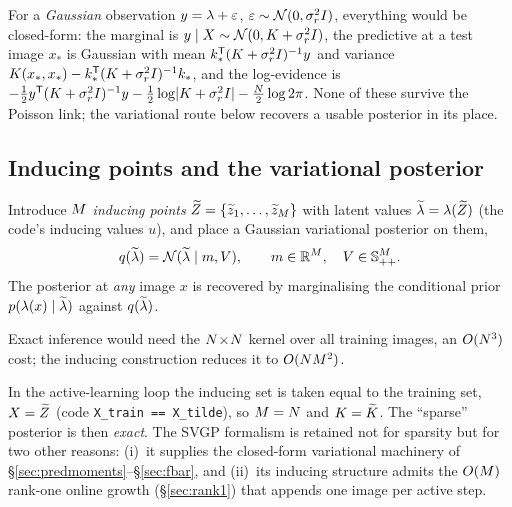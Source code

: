 \begin{remark}
For a \emph{Gaussian} observation $y=\lambda+\varepsilon$,
$\varepsilon\sim\mathcal{N}(0,\sigma^{2}_r I)$, everything would be closed-form: the
marginal is $y\mid X\sim\mathcal{N}(0,K+\sigma^{2}_r I)$, the predictive at a test
image $x_\ast$ is Gaussian with mean $k_\ast^{\mathsf{T}}(K+\sigma^{2}_r I)^{-1}y$
and variance $K(x_\ast,x_\ast)-k_\ast^{\mathsf{T}}(K+\sigma^{2}_r I)^{-1}k_\ast$,
and the log-evidence is
$-\tfrac12y^{\mathsf{T}}(K+\sigma^{2}_r I)^{-1}y-\tfrac12\log\lvert K+\sigma^{2}_r I\rvert-\tfrac{N}{2}\log 2\pi$.
None of these survive the Poisson link; the variational route below recovers a
usable posterior in its place.
\end{remark}

\subsection{Inducing points and the variational posterior}\label{sec:inducing}

\begin{definition}
Introduce $M$ \emph{inducing points} $\widetilde{Z}=\{\widetilde{z}_1,\dots,\widetilde{z}_{M}\}$
with latent values $\widetilde{\lambda}=\lambda(\widetilde{Z})$ (the code's inducing values $u$), and place a
Gaussian variational posterior on them,
\begin{equation}
  q(\widetilde{\lambda})=\mathcal{N}(\widetilde{\lambda}\mid m,V),\qquad
  m\in\mathbb{R}^{M},\quad V\in\mathbb{S}_{++}^{M}.
  \label{eq:qdef}
\end{equation}
The posterior at \emph{any} image $x$ is recovered by marginalising the
conditional prior $p(\lambda(x)\mid\widetilde{\lambda})$ against $q(\widetilde{\lambda})$.
\end{definition}

Exact inference would need the $N\!\times\!N$ kernel over all training
images, an $O(N^3)$ cost; the inducing construction reduces it to
$O(NM^2)$.

\begin{remark}[Closed-loop invariant $\Mind=\Ntr$]\label{rem:MeqN}
In the active-learning loop the inducing set is taken equal to the training set,
$X=\widetilde{Z}$ (code \texttt{X\_train == X\_tilde}), so $\Mind=\Ntr$ and $K=\widetilde{K}$.
The ``sparse'' posterior is then \emph{exact}. The SVGP formalism is retained not
for sparsity but for two other reasons: (i)~it supplies the closed-form
variational machinery of \S\ref{sec:predmoments}--\S\ref{sec:fbar}, and (ii)~its
inducing structure admits the $O(M)$ rank-one online growth
(\S\ref{sec:rank1}) that appends one image per active step.
\end{remark}

